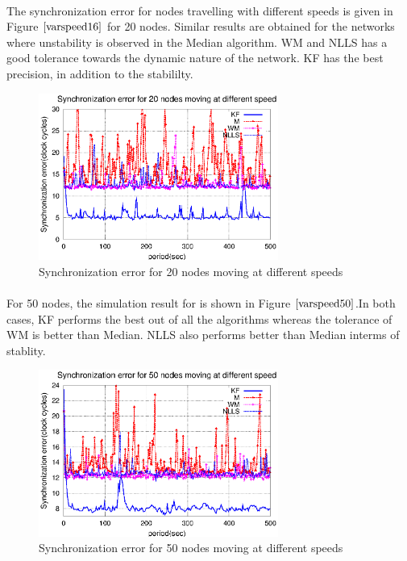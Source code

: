 \documentclass[a4paper,10pt]{report}
\begin{document}
\paragraph*{}
The synchronization error for nodes travelling with different speeds is given in Figure $\ref{varspeed16}$ for 20 nodes. Similar results are obtained for the networks where unstability is observed in the Median algorithm. WM and NLLS has a good tolerance towards the dynamic nature of the network. KF has the best precision, in addition to the stabililty.
\begin{figure}[!h]
 \centering
 \includegraphics[width=0.7\textwidth]{varspeed20}
 \caption{Synchronization error for 20 nodes moving at different speeds}
 \label{varspeed16}
\end{figure}
\paragraph*{}
For 50 nodes, the simulation result for is shown in Figure $\ref{varspeed50}$.In both cases, KF performs the best out of all the algorithms whereas the tolerance of WM is better than Median. NLLS also performs better than Median interms of stablity.
\begin{figure}[!h]
 \centering
 \includegraphics[width=0.7\textwidth]{varspeed50}
 \caption{Synchronization error for 50 nodes moving at different speeds}
 \label{varspeed50}
\end{figure}
\end{document}
